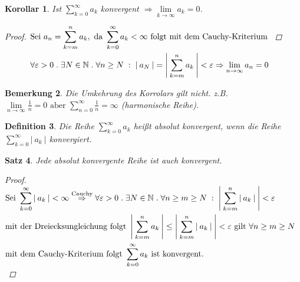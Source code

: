 \documentclass[a4paper,titlepage,oneside]{article}
\def\N{\ensuremath{\mathbb{N}} }
\renewcommand{\epsilon}{\ensuremath{\varepsilon} }
\def\sp{\hspace{0,1cm}}
\def\spdot{\sp.\sp}
\def\spcolon{\sp:\sp}
\newcommand{\suminf}[2][n]{\ensuremath{\sum_{#1= 0}^{\infty}{#2}}}
\renewcommand{\liminf}[2][n]{\ensuremath{\lim\limits_{#1 \rightarrow \infty}{#2}}}
\newcommand{\abs}[1]{\ensuremath{\left|\:#1\:\right|}}
\theoremstyle{thmstyle}
\newtheorem{satz}{Satz}[section]
\newtheorem{korr}[satz]{Korollar}
\newtheorem{defi}[satz]{Definition}
\newtheorem{bem}[satz]{Bemerkung}
\theoremstyle{subthmstyle}
\begin{document}
\begin{korr}
Ist $ \displaystyle \suminf[k]{a_k}$ konvergent $ \displaystyle \Rightarrow \liminf[k]{a_k} = 0$.
\begin{proof}
\begin{math}\displaystyle \begin{aligned}[t]
&\text{Sei } a_n = \sum_{k = m}^{n}{a_k}, \text{ da } \suminf[k]{a_k} < \infty \text{ folgt mit dem Cauchy-Kriterium }\\
&\forall \epsilon > 0 \spdot \exists N \in \N \spdot \forall n \ge N \spcolon \abs{a_N} = \abs{ \sum_{k = m}^{n}{a_k}} < \epsilon \Rightarrow \liminf{a_n} = 0\\
\end{aligned}\\\end{math} 
\end{proof}
\end{korr}

\begin{bem}
Die Umkehrung des Korrolars gilt nicht. z.B. $ \displaystyle \liminf{\frac{1}{n}} = 0 \text{ aber } \suminf{\frac{1}{n}} = \infty $ (harmonische Reihe).
\end{bem}

\begin{defi}
Die Reihe $ \displaystyle \suminf[k]{a_k} $ heißt absolut konvergent, wenn die Reihe$ \displaystyle  \suminf[k]{\abs{a_k}}$ konvergiert.
\end{defi}

\begin{satz}
Jede absolut konvergente Reihe ist auch konvergent.
\begin{proof}
\begin{math}\displaystyle \begin{aligned}[t]
&\text{Sei }\suminf[k]{\abs{a_k}} < \infty  \overset{\text{Cauchy}}{\Rightarrow} \forall \epsilon > 0 \spdot \exists N \in \N \spdot \forall n \ge m \ge N \spcolon \abs{\sum_{k=m}^{n}{\abs{a_k}}} < \epsilon \\
&\text{mit der Dreiecksungleichung folgt } \abs{\sum_{k=m}^{n}{a_k}} \le \abs{\sum_{k=m}^{n}{\abs{a_k}}} < \epsilon \text{ gilt } \forall n \ge m \ge N \\
&\text{mit dem Cauchy-Kriterium folgt } \suminf[k]{a_k}\text{ ist konvergent.}
\end{aligned}\\\end{math}
\end{proof}
\end{satz}
\end{document}
